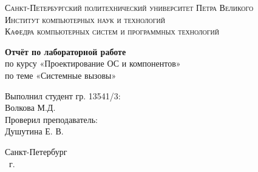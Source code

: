 \begin{titlepage}
    \centering
    \textsc{Санкт-Петербургский политехнический университет Петра Великого}\\[3mm]
    \textsc{Институт компьютерных наук и технологий}\\[3mm]
    \textsc{Кафедра компьютерных систем и программных технологий}
	
	\vfill
	
	\textbf{Отчёт по лабораторной работе }\\[3mm]
	по курсу «Проектирование ОС и компонентов»\\[3mm]
	по теме «Системные вызовы»\\[41mm]
	
    \begin{flushright}
	\begin{minipage}{.35\textwidth}
		Выполнил студент гр. 13541/3:\\
		Волкова М.Д.\\[3mm]
		Проверил преподаватель:\\
		Душутина Е. В.
	\end{minipage}
    \end{flushright}
	
	\vfill

	Санкт-Петербург\\
	\the\year\ г.
\end{titlepage}

